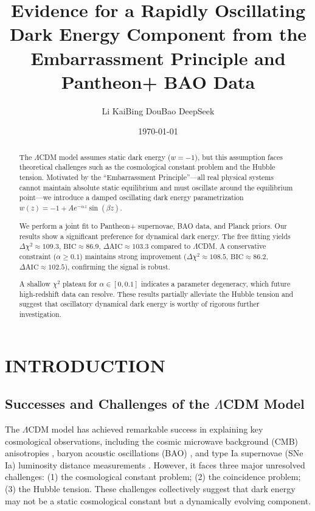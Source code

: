 \documentclass[10pt,twocolumn]{article}
\title{Evidence for a Rapidly Oscillating Dark Energy Component from the Embarrassment Principle and Pantheon+ BAO Data}
\author{Li KaiBing \quad DouBao \quad DeepSeek}
\date{\today}
\def\BIC{\text{BIC}}
\def\AIC{\text{AIC}}
\begin{document}
\maketitle

\begin{abstract}
The $\Lambda$CDM model assumes static dark energy ($w=-1$), but this assumption faces theoretical challenges such as the cosmological constant problem and the Hubble tension. Motivated by the ``Embarrassment Principle''—all real physical systems cannot maintain absolute static equilibrium and must oscillate around the equilibrium point—we introduce a damped oscillating dark energy parametrization $w(z) = -1 + A e^{-\alpha z}\sin(\beta z)$.

We perform a joint fit to Pantheon+ supernovae, BAO data, and Planck priors. Our results show a significant preference for dynamical dark energy. The free fitting yields $\Delta\chi^2 \approx 109.3$, $\BIC \approx 86.9$, $\Delta\AIC \approx 103.3$ compared to $\Lambda$CDM. A conservative constraint ($\alpha\geq 0.1$) maintains strong improvement ($\Delta\chi^2 \approx 108.5$, $\BIC \approx 86.2$, $\Delta\AIC \approx 102.5$), confirming the signal is robust.

A shallow $\chi^2$ plateau for $\alpha \in [0, 0.1]$ indicates a parameter degeneracy, which future high-redshift data can resolve. These results partially alleviate the Hubble tension and suggest that oscillatory dynamical dark energy is worthy of rigorous further investigation.
\end{abstract}

\section{INTRODUCTION}
\subsection{Successes and Challenges of the $\Lambda$CDM Model}
The $\Lambda$CDM model has achieved remarkable success in explaining key cosmological observations, including the cosmic microwave background (CMB) anisotropies \cite{planck2020}, baryon acoustic oscillations (BAO) \cite{alam2017}, and type Ia supernovae (SNe Ia) luminosity distance measurements \cite{scolnic2022}. However, it faces three major unresolved challenges: (1) the cosmological constant problem; (2) the coincidence problem; (3) the Hubble tension. These challenges collectively suggest that dark energy may not be a static cosmological constant but a dynamically evolving component.
\end{document}
